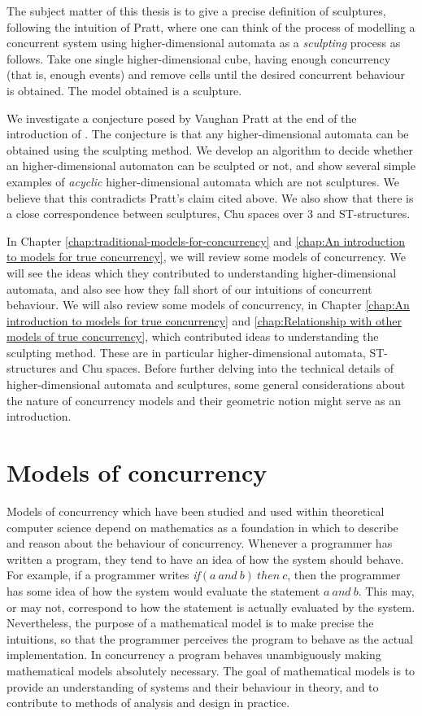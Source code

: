     The subject matter of this thesis is to give a precise definition of sculptures, following the intuition of Pratt, where one can think of the process of modelling a concurrent system using higher-dimensional automata as a \emph{sculpting} process as follows. Take one single higher-dimensional cube, having enough concurrency (that is, enough events) and remove cells until the desired concurrent behaviour is obtained. The model obtained is a sculpture.
    
    We investigate a conjecture posed by Vaughan Pratt at the end of the introduction of \cite{Pratt00Sculptures}. The conjecture is that any higher-dimensional automata can be obtained using the sculpting method. We develop an algorithm to decide whether an higher-dimensional automaton can be sculpted or not, and show several simple examples of \emph{acyclic} higher-dimensional automata which are not sculptures. We believe that this contradicts Pratt's claim cited above.  We also show that there is a close correspondence between sculptures, Chu spaces over 3 \cite{Pratt00Sculptures} and ST-structures.
    
    In Chapter \ref{chap:traditional-models-for-concurrency} and \ref{chap:An introduction to models for true concurrency}, we will review some models of concurrency. We will see the ideas which they contributed to understanding higher-dimensional automata, and also see how they fall short of our intuitions of concurrent behaviour. We will also review some models of concurrency, in Chapter \ref{chap:An introduction to models for true concurrency} and \ref{chap:Relationship with other models of true concurrency}, which contributed ideas to understanding the sculpting method. These are in particular higher-dimensional automata, ST-structures and Chu spaces. Before further delving into the technical details of higher-dimensional automata and sculptures, some general considerations about the nature of concurrency models and their geometric notion might serve as an introduction.
    
    \section{Models of concurrency}
    Models of concurrency which have been studied and used within theoretical computer science depend on mathematics as a foundation in which to describe and reason about the behaviour of concurrency. Whenever a programmer has written a program, they tend to have an idea of how the system should behave. For example, if a programmer writes \emph{if}$(a\ and\ b)\ then\ c$, then the programmer has some idea of how the system would evaluate the statement $a\ and\ b$. This may, or may not, correspond to how the statement is actually evaluated by the system. Nevertheless, the purpose of a mathematical model is to make precise the intuitions, so that the programmer perceives the program to behave as the actual implementation. In concurrency a program behaves unambiguously making mathematical models absolutely necessary. The goal of mathematical models is to provide an understanding of systems and their behaviour in theory, and to contribute to methods of analysis and design in practice.

